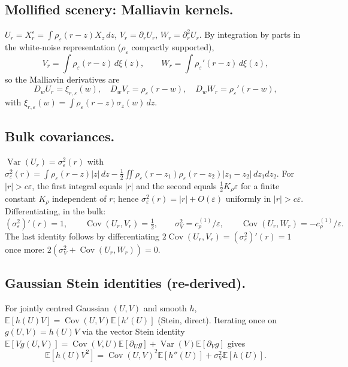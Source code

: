 \documentclass[11pt,reqno]{amsart}
\theoremstyle{plain}
\theoremstyle{definition}
\theoremstyle{remark}
\newcommand{\E}{\mathbb{E}}
\DeclareMathOperator{\Var}{Var}
\DeclareMathOperator{\Cov}{Cov}
\begin{document}
\subsection*{Mollified scenery: Malliavin kernels.}
$U_{r}=X^{\varepsilon}_{r}=\int\rho_{\varepsilon}(r-z)X_{z}\,dz$,
$V_{r}=\partial_{r}U_{r}$, $W_{r}=\partial_{r}^{2}U_{r}$.
By integration by parts in the white-noise representation
($\rho_{\varepsilon}$ compactly supported),
\begin{equation}\label{eq:VW-rep}
 V_{r}=\int\rho_{\varepsilon}(r-z)\,d\xi(z),
 \qquad
 W_{r}=\int\rho_{\varepsilon}'(r-z)\,d\xi(z),
\end{equation}
so the Malliavin derivatives are
\begin{equation}\label{eq:Dw}
 D_{w}U_{r}=\xi_{r,\varepsilon}(w),\quad
 D_{w}V_{r}=\rho_{\varepsilon}(r-w),\quad
 D_{w}W_{r}=\rho_{\varepsilon}'(r-w),
\end{equation}
with
$\xi_{r,\varepsilon}(w)=\int\rho_{\varepsilon}(r-z)\sigma_{z}(w)\,dz$.

\subsection*{Bulk covariances.}
$\Var(U_{r})=\sigma_{\varepsilon}^{2}(r)$ with
$\sigma_{\varepsilon}^{2}(r)=
\int\rho_{\varepsilon}(r-z)|z|\,dz
-\tfrac12\iint\rho_{\varepsilon}(r-z_{1})\rho_{\varepsilon}(r-z_{2})|z_{1}-z_{2}|\,dz_{1}dz_{2}$.
For $|r|>c\varepsilon$, the first integral equals $|r|$ and the
second equals $\tfrac12 K_{\rho}\varepsilon$ for a finite constant
$K_{\rho}$ independent of $r$; hence
$\sigma_{\varepsilon}^{2}(r)=|r|+O(\varepsilon)$ uniformly in
$|r|>c\varepsilon$. Differentiating, in the bulk:
\begin{equation}\label{eq:bulk-cov}
 (\sigma_{\varepsilon}^{2})'(r)=1,\qquad
 \Cov(U_{r},V_{r})=\tfrac12,\qquad
 \sigma_{V}^{2}=c_{\rho}^{(1)}/\varepsilon,\qquad
 \Cov(U_{r},W_{r})=-c_{\rho}^{(1)}/\varepsilon.
\end{equation}
The last identity follows by differentiating
$2\Cov(U_{r},V_{r})=(\sigma_{\varepsilon}^{2})'(r)=1$ once more:
$2(\sigma_{V}^{2}+\Cov(U_{r},W_{r}))=0$.

\subsection*{Gaussian Stein identities (re-derived).}
For jointly centred Gaussian $(U,V)$ and smooth $h$,
$\E[h(U)V]=\Cov(U,V)\E[h'(U)]$ (Stein, direct). Iterating once on
$g(U,V)=h(U)V$ via the vector Stein identity
$\E[Vg(U,V)]=\Cov(V,U)\E[\partial_{U}g]+\Var(V)\E[\partial_{V}g]$
gives
\begin{equation}\label{eq:Stein-sq}
 \E[h(U)V^{2}]=\Cov(U,V)^{2}\E[h''(U)]+\sigma_{V}^{2}\E[h(U)].
\end{equation}
\end{document}
